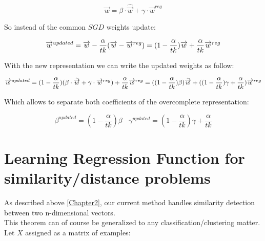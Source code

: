 \begin{equation}
\overrightarrow{w} = \beta\cdot\hat{\overrightarrow{w}} + \gamma \cdot \overrightarrow{w}^{reg}
\end{equation}

So instead of the common $SGD$ weights update:

\begin{equation}
\\ \overrightarrow{w}^{updated} = \overrightarrow{w} - \frac{\alpha}{tk}(
\overrightarrow{w} - \overrightarrow{w}^{reg})
\\ \\= (1-\frac{\alpha}{tk})\overrightarrow{w} + \frac{\alpha}{tk}\overrightarrow{w}^{reg}
\end{equation}

With the new representation we can write the updated weights as follow:

\begin{equation}
\\ \overrightarrow{w}^{updated} = (1-\frac{\alpha}{tk})(\beta \cdot \hat{\overrightarrow{w}} + \gamma \cdot \overrightarrow{w}^{reg}) +  \frac{\alpha}{tk}\overrightarrow{w}^{reg}
\\\\= ((1-\frac{\alpha}{tk})\beta)\hat{\overrightarrow{w}} + 
((1-\frac{\alpha}{tk})\gamma
+\frac{\alpha}{tk})\overrightarrow{w}^{reg}
\end{equation}

Which allows to separate both coefficients of the overcomplete representation:

\begin{equation}
\beta^{updated} = (1-\frac{\alpha}{tk})\beta \:\:\:\: \gamma^{updated} = (1-\frac{\alpha}{tk})\gamma+\frac{\alpha}{tk}
\end{equation}

\vskip20pt




\section{Learning Regression Function for similarity/distance problems}
\label{learn_regression}
As described above \ref{Chapter2}, our current method handles similarity detection between two n-dimensional vectors.\\ This theorem can of course be generalized to any classification/clustering matter.
\\

Let $X$ assigned as a matrix of examples:\\ 

